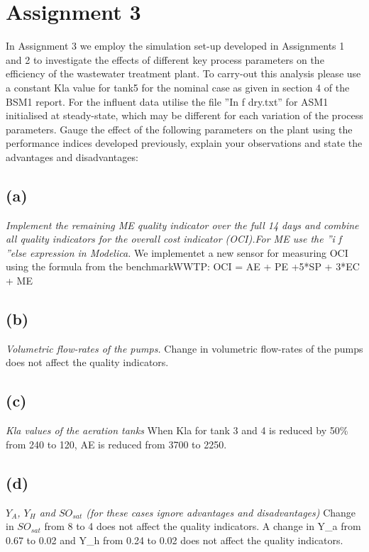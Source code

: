 \section*{Assignment 3}\label{sec:Ass3}
In Assignment 3 we employ the simulation set-up developed in Assignments 1 and 2 to investigate
the effects of different key process parameters on the efficiency of the wastewater treatment plant.
To carry-out this analysis please use a constant Kla value for tank5 for the nominal case as given in
section 4 of the BSM1 report. For the influent data utilise the file ”In f dry.txt” for ASM1 initialised at
steady-state, which may be different for each variation of the process parameters.
\newline
Gauge the effect of the following parameters on the plant using the performance indices developed
previously, explain your observations and state the advantages and disadvantages:

\subsection*{(a)}
\textit{Implement the remaining ME quality indicator over the full 14 days and combine all quality
indicators for the overall cost indicator (OCI).For ME use the ”i f ”else expression in Modelica.} \newline
We implementet a new sensor for measuring OCI using the formula from the benchmarkWWTP: \newline
OCI = AE + PE +5*SP + 3*EC + ME

\subsection*{(b)}
\textit{Volumetric flow-rates of the pumps.} \newline
Change in volumetric flow-rates of the pumps does not affect the quality indicators.

\subsection*{(c)}
\textit{Kla values of the aeration tanks} \newline
When Kla for tank 3 and 4 is reduced by 50\% from 240 to 120, AE is reduced from 3700 to 2250.

\subsection*{(d)}
\textit{$Y_A$, $Y_H$ and $SO_{sat}$ (for these cases ignore advantages and disadvantages)} \newline
Change in $SO_{sat}$ from 8 to 4 does not affect the quality indicators. A change in Y\_a from 0.67 to 0.02 and Y\_h from 0.24 to 0.02 does not affect the quality indicators.
